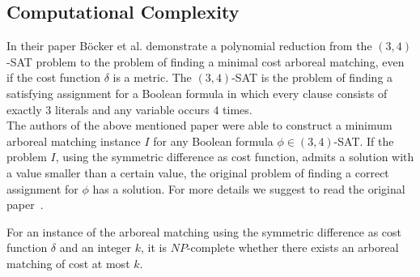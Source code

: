 \subsection{Computational Complexity}
In their paper Böcker et al. demonstrate a polynomial reduction from the $(3,4)$-SAT problem to the problem of finding a minimal cost arboreal matching, even if the cost function $\delta$ is a metric. The $(3,4)$-SAT is the problem of finding a satisfying assignment for a Boolean formula in which every clause consists of exactly $3$ literals and any variable occurs $4$ times.\\
The authors of the above mentioned paper were able to construct a minimum arboreal matching instance $I$ for any Boolean formula $\phi \in (3,4)$-SAT. If the problem $I$, using the symmetric difference as cost function, admits a solution with a value smaller than a certain value, the original problem of finding a correct assignment for $\phi$ has a solution. For more details we suggest to read the original paper~\cite{Boe}. 
\begin{thm}
For an instance of the arboreal matching using the symmetric difference as cost function $\delta$ and an integer $k$, it is $NP$-complete whether there exists an arboreal matching of cost at most $k$.
\end{thm}

